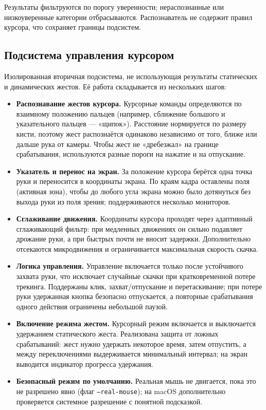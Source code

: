 \documentclass[11pt,a4paper]{article}
\begin{document}
\noindent Результаты фильтруются по порогу уверенности; нераспознанные или низкоуверенные
категории отбрасываются. Распознаватель не содержит правил курсора, что сохраняет границы
подсистем.

\subsection{Подсистема управления курсором}

Изолированная вторичная подсистема, не использующая результаты статических и динамических жестов.
Её работа складывается из нескольких шагов:

\begin{itemize}[leftmargin=1.4em]
  \item \textbf{Распознавание жестов курсора.} Курсорные команды определяются по взаимному
        положению пальцев (например, сближение большого и указательного пальцев — «щипок»).
        Расстояние нормируется по размеру кисти, поэтому жест распознаётся одинаково независимо от
        того, ближе или дальше рука от камеры. Чтобы жест не «дребезжал» на границе срабатывания,
        используются разные пороги на нажатие и на отпускание.
  \item \textbf{Указатель и перенос на экран.} За положение курсора берётся одна точка руки и
        переносится в координаты экрана. По краям кадра оставлены поля (активная зона), чтобы до
        любого угла экрана можно было дотянуться без выхода руки из поля зрения; поддерживаются
        несколько мониторов.
  \item \textbf{Сглаживание движения.} Координаты курсора проходят через адаптивный сглаживающий
        фильтр: при медленных движениях он сильно подавляет дрожание руки, а при быстрых почти не
        вносит задержки. Дополнительно отсекаются микродвижения и ограничивается максимальная
        скорость скачка.
  \item \textbf{Логика управления.} Управление включается только после устойчивого захвата руки,
        что исключает случайные скачки при кратковременной потере трекинга. Поддержаны клик,
        захват/отпускание и перетаскивание; при потере руки удержанная кнопка безопасно
        отпускается, а повторные срабатывания одного действия ограничены небольшой паузой.
  \item \textbf{Включение режима жестом.} Курсорный режим включается и выключается удержанием
        статического жеста. Реализована защита от ложных срабатываний: жест нужно удержать
        некоторое время, затем отпустить, а между переключениями выдерживается минимальный
        интервал; на экран выводится индикатор прогресса удержания.
  \item \textbf{Безопасный режим по умолчанию.} Реальная мышь не двигается, пока это не разрешено
        явно (флаг \texttt{--real-mouse}); на macOS дополнительно проверяется системное разрешение
        с понятной подсказкой.
\end{itemize}
\end{document}

